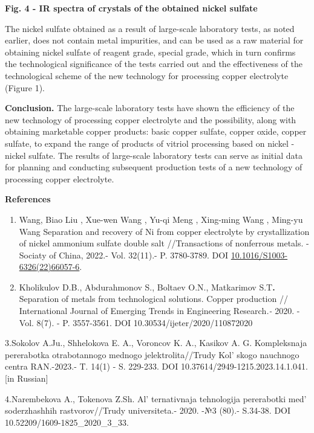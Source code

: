 {\bfseries Fig. 4 - IR spectra of crystals of the obtained nickel sulfate}

The nickel sulfate obtained as a result of large-scale laboratory tests,
as noted earlier, does not contain metal impurities, and can be used as
a raw material for obtaining nickel sulfate of reagent grade, special
grade, which in turn confirms the technological significance of the
tests carried out and the effectiveness of the technological scheme of
the new technology for processing copper electrolyte (Figure 1).

{\bfseries Conclusion.} The large-scale laboratory tests have shown the
efficiency of the new technology of processing copper electrolyte and
the possibility, along with obtaining marketable copper products: basic
copper sulfate, copper oxide, copper sulfate, to expand the range of
products of vitriol processing based on nickel - nickel sulfate. The
results of large-scale laboratory tests can serve as initial data for
planning and conducting subsequent production tests of a new technology
of processing copper electrolyte.

{\bfseries References}

\begin{enumerate}
\def\labelenumi{\arabic{enumi}.}
\item
  Wang, Biao Liu , Xue-wen Wang , Yu-qi Meng , Xing-ming Wang , Ming-yu
  Wang Separation and recovery of Ni from copper electrolyte by
  crystallization of nickel ammonium sulfate double salt //Transactions
  of nonferrous metals. -Sociaty of China, 2022.- Vol. 32(11).- P.
  3780-3789. DOI
  \href{http://dx.doi.org/10.1016/S1003-6326(22)66057-6}{10.1016/S1003-6326(22)66057-6}.
\item
  Kholikulov D.B., Abdurahmonov S., Boltaev O.N., Matkarimov
  S.T{\bfseries .} Separation of metals from technological solutions.
  Copper production // International Journal of Emerging Trends in
  Engineering Research\emph{.-} 2020. - Vol. 8(7). - P. 3557-3561. DOI
  10.30534/ijeter/2020/110872020
\end{enumerate}

3.Sokolov A.Ju., Shhelokova E. A., Voroncov K. A., Kasikov A. G.
Kompleksnaja pererabotka otrabotannogo mednogo jelektrolita//Trudy
Kol' skogo nauchnogo centra RAN.-2023.- T. 14(1) - S.
229-233. DOI 10.37614/2949-1215.2023.14.1.041. {[}in Russian{]}

4.Narembekova A., Tokenova Z.Sh. Al' ternativnaja
tehnologija pererabotki med' soderzhashhih
rastvorov//Trudy universiteta.- 2020. -№3 (80).- S.34-38. DOI
10.52209/1609-1825\_2020\_3\_33.

